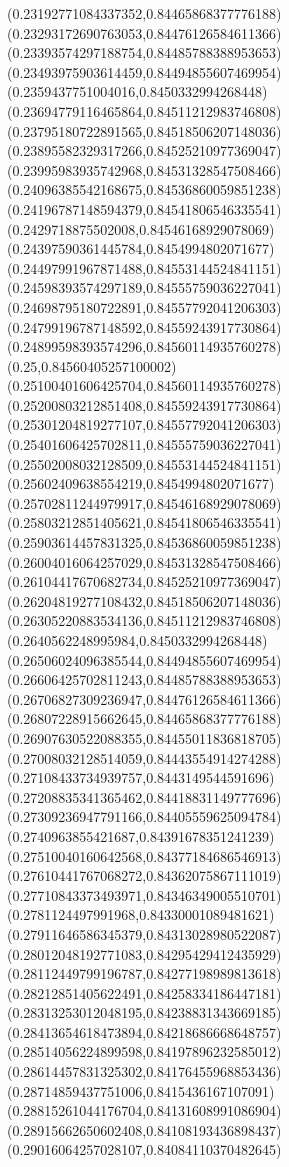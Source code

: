 \documentclass[12pt]{article}
\theoremstyle{plain}
\theoremstyle{definition}
\theoremstyle{remark}
\begin{document}
\begin{figure}
{  (0.23192771084337352,0.84465868377776188)%
  (0.23293172690763053,0.84476126584611366)%
  (0.23393574297188754,0.84485788388953653)%
  (0.23493975903614459,0.84494855607469954)%
  (0.2359437751004016,0.8450332994268448)%
  (0.23694779116465864,0.84511212983746808)%
  (0.23795180722891565,0.84518506207148036)%
  (0.23895582329317266,0.84525210977369047)%
  (0.23995983935742968,0.84531328547508466)%
  (0.24096385542168675,0.84536860059851238)%
  (0.24196787148594379,0.84541806546335541)%
  (0.2429718875502008,0.84546168929078069)%
  (0.24397590361445784,0.8454994802071677)%
  (0.24497991967871488,0.84553144524841151)%
  (0.24598393574297189,0.84555759036227041)%
  (0.24698795180722891,0.84557792041206303)%
  (0.24799196787148592,0.84559243917730864)%
  (0.24899598393574296,0.84560114935760278)%
  (0.25,0.84560405257100002)%
  (0.25100401606425704,0.84560114935760278)%
  (0.25200803212851408,0.84559243917730864)%
  (0.25301204819277107,0.84557792041206303)%
  (0.25401606425702811,0.84555759036227041)%
  (0.25502008032128509,0.84553144524841151)%
  (0.25602409638554219,0.8454994802071677)%
  (0.25702811244979917,0.84546168929078069)%
  (0.25803212851405621,0.84541806546335541)%
  (0.25903614457831325,0.84536860059851238)%
  (0.26004016064257029,0.84531328547508466)%
  (0.26104417670682734,0.84525210977369047)%
  (0.26204819277108432,0.84518506207148036)%
  (0.26305220883534136,0.84511212983746808)%
  (0.2640562248995984,0.8450332994268448)%
  (0.26506024096385544,0.84494855607469954)%
  (0.26606425702811243,0.84485788388953653)%
  (0.26706827309236947,0.84476126584611366)%
  (0.26807228915662645,0.84465868377776188)%
  (0.26907630522088355,0.84455011836818705)%
  (0.27008032128514059,0.84443554914274288)%
  (0.27108433734939757,0.8443149544591696)%
  (0.27208835341365462,0.84418831149777696)%
  (0.27309236947791166,0.84405559625094784)%
  (0.2740963855421687,0.84391678351241239)%
  (0.27510040160642568,0.84377184686546913)%
  (0.27610441767068272,0.84362075867111019)%
  (0.27710843373493971,0.84346349005510701)%
  (0.2781124497991968,0.84330001089481621)%
  (0.27911646586345379,0.84313028980522087)%
  (0.28012048192771083,0.84295429412435929)%
  (0.28112449799196787,0.84277198989813618)%
  (0.28212851405622491,0.84258334186447181)%
  (0.28313253012048195,0.84238831343669185)%
  (0.28413654618473894,0.84218686668648757)%
  (0.28514056224899598,0.84197896232585012)%
  (0.28614457831325302,0.84176455968853436)%
  (0.28714859437751006,0.8415436167107091)%
  (0.28815261044176704,0.84131608991086904)%
  (0.28915662650602408,0.84108193436898437)%
  (0.29016064257028107,0.84084110370482645)%
}
\end{figure}
\end{document}
